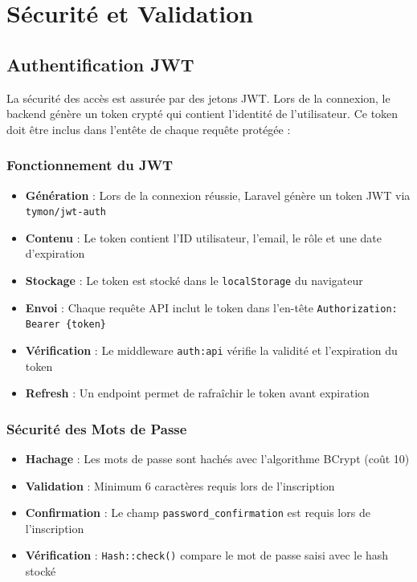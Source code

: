 \documentclass[12pt,a4paper]{report}
\begin{document}
\section{Sécurité et Validation}

\subsection{Authentification JWT}

La sécurité des accès est assurée par des jetons JWT. Lors de la connexion, le backend génère un token crypté qui contient l'identité de l'utilisateur. Ce token doit être inclus dans l'entête de chaque requête protégée :

\subsubsection{Fonctionnement du JWT}

\begin{itemize}
    \item \textbf{Génération} : Lors de la connexion réussie, Laravel génère un token JWT via \texttt{tymon/jwt-auth}
    \item \textbf{Contenu} : Le token contient l'ID utilisateur, l'email, le rôle et une date d'expiration
    \item \textbf{Stockage} : Le token est stocké dans le \texttt{localStorage} du navigateur
    \item \textbf{Envoi} : Chaque requête API inclut le token dans l'en-tête \texttt{Authorization: Bearer \{token\}}
    \item \textbf{Vérification} : Le middleware \texttt{auth:api} vérifie la validité et l'expiration du token
    \item \textbf{Refresh} : Un endpoint permet de rafraîchir le token avant expiration
\end{itemize}

\subsubsection{Sécurité des Mots de Passe}

\begin{itemize}
    \item \textbf{Hachage} : Les mots de passe sont hachés avec l'algorithme BCrypt (coût 10)
    \item \textbf{Validation} : Minimum 6 caractères requis lors de l'inscription
    \item \textbf{Confirmation} : Le champ \texttt{password\_confirmation} est requis lors de l'inscription
    \item \textbf{Vérification} : \texttt{Hash::check()} compare le mot de passe saisi avec le hash stocké
\end{itemize}
\end{document}
